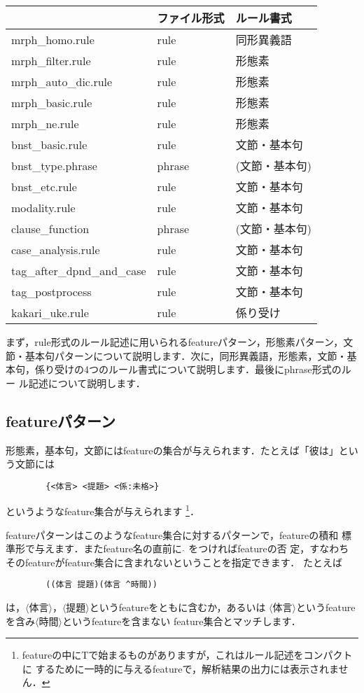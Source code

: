 \documentclass[a4j,11pt,titlepage]{jarticle}
\def\fl{$\langle$}
\def\fr{$\rangle$}
\begin{document}
\begin{center}
 \begin{tabular}{l|l|l} \hline
  & ファイル形式 & ルール書式 \\ \hline
  mrph\_homo.rule   & rule & 同形異義語 \\
  mrph\_filter.rule & rule & 形態素 \\
  mrph\_auto\_dic.rule & rule & 形態素 \\
  mrph\_basic.rule  & rule & 形態素 \\
  mrph\_ne.rule     & rule & 形態素 \\
  bnst\_basic.rule  & rule & 文節・基本句 \\
  bnst\_type.phrase & phrase & (文節・基本句) \\
  bnst\_etc.rule    & rule & 文節・基本句 \\
  modality.rule     & rule & 文節・基本句 \\
  clause\_function  & phrase & (文節・基本句) \\
  case\_analysis.rule & rule & 文節・基本句 \\
  tag\_after\_dpnd\_and\_case & rule & 文節・基本句 \\
  tag\_postprocess & rule & 文節・基本句 \\
  kakari\_uke.rule  & rule & 係り受け \\ \hline
 \end{tabular}
\end{center}

まず，rule形式のルール記述に用いられるfeatureパターン，形態素パターン，文
節・基本句パターンについて説明します．次に，同形異義語，形態素，文節・基
本句，係り受けの4つのルール書式について説明します．最後にphrase形式のルー
ル記述について説明します．


\subsection{featureパターン}

形態素，基本句，文節にはfeatureの集合が与えられます．たとえば「彼は」とい
う文節には
\begin{verbatim}
        {<体言> <提題> <係:未格>}  
\end{verbatim}
というようなfeature集合が与えられます
\footnote{
featureの中にTで始まるものがありますが，これはルール記述をコンパクトに
するために一時的に与えるfeatureで，解析結果の出力には表示されません．}．

featureパターンはこのようなfeature集合に対するパターンで，featureの積和
標準形で与えます．またfeature名の直前に $\hat{ }$ をつければfeatureの否
定，すなわちそのfeatureがfeature集合に含まれないということを指定できます．
たとえば
\begin{verbatim}
        ((体言 提題)(体言 ^時間))
\end{verbatim}
は，\fl 体言\fr ，\fl 提題\fr というfeatureをともに含むか，あるいは
\fl 体言\fr というfeatureを含み\fl 時間\fr というfeatureを含まない
feature集合とマッチします．
\end{document}
